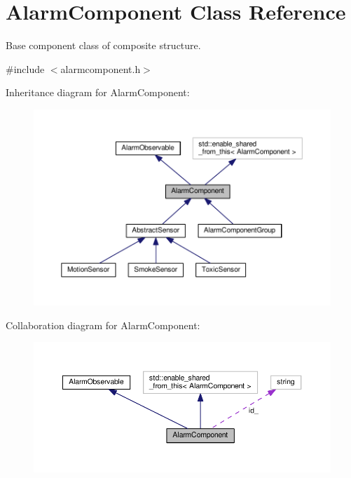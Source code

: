 \hypertarget{classAlarmComponent}{}\section{Alarm\+Component Class Reference}
\label{classAlarmComponent}


Base component class of composite structure.  




{\ttfamily \#include $<$alarmcomponent.\+h$>$}



Inheritance diagram for Alarm\+Component\+:\nopagebreak
\begin{figure}[H]
\begin{center}
\leavevmode
\includegraphics[width=350pt]{classAlarmComponent__inherit__graph}
\end{center}
\end{figure}


Collaboration diagram for Alarm\+Component\+:\nopagebreak
\begin{figure}[H]
\begin{center}
\leavevmode
\includegraphics[width=350pt]{classAlarmComponent__coll__graph}
\end{center}
\end{figure}
